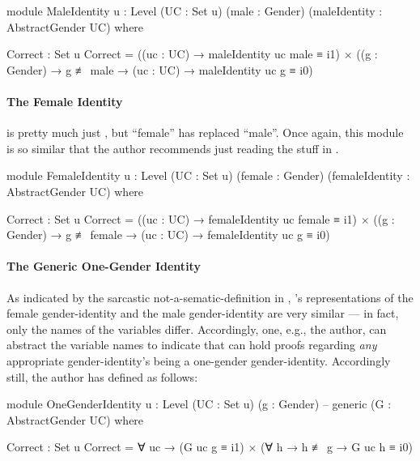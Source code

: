 \documentclass{article}
\theoremstyle{remark}
\begin{document}
\begin{code}
    module MaleIdentity
           {u : Level}
           (UC : Set u)
           (male : Gender)
           (maleIdentity : AbstractGender UC) where

      Correct : Set u
      Correct = ((uc : UC) → maleIdentity uc male ≡ i1)
              × ((g : Gender) → g ≢ male → (uc : UC) →
                 maleIdentity uc g ≡ i0)
\end{code}

\paragraph{The Female Identity}\label{sec:gender8exampleIdentityFemale}
 is pretty much just , but ``female'' has replaced ``male''.  Once again, this module is so similar that the author recommends just reading the stuff in .

\begin{code}
    module FemaleIdentity
           {u : Level}
           (UC : Set u)
           (female : Gender)
           (femaleIdentity : AbstractGender UC) where

      Correct : Set u
      Correct = ((uc : UC) → femaleIdentity uc female ≡ i1)
              × ((g : Gender) → g ≢ female → (uc : UC) →
                 femaleIdentity uc g ≡ i0)
\end{code}

\paragraph{The Generic One-Gender Identity}
As indicated by the sarcastic not-a-sematic-definition in , 's representations of the female gender-identity and the male gender-identity are very similar --- in fact, only the names of the variables differ.  Accordingly, one, e.g., the author, can abstract the variable names to indicate that  can hold proofs regarding \emph{any} appropriate gender-identity's being a one-gender gender-identity.  Accordingly still, the author has defined  as follows:

\begin{code}
    module OneGenderIdentity
           {u : Level}
           (UC : Set u)
           (g : Gender) -- generic
           (G : AbstractGender UC) where

      Correct : Set u
      Correct = ∀ uc → (G uc g ≡ i1) × (∀ h → h ≢ g → G uc h ≡ i0)
\end{code}
\end{document}
